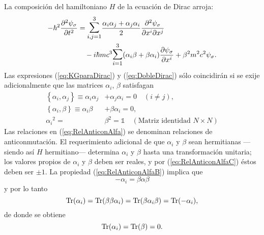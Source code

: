 La composición del hamiltoniano $H$ de la ecuación de Dirac arroja:
\begin{equation}\label{eq:DobleDirac}
\begin{aligned}
 -\hbar^2 \frac{\partial^2 \psi_\sigma}{\partial t^2} &= \mathlarger{\mathlarger{\sum}}_{i,j=1}^3\frac{\alpha_i \alpha_j+\alpha_j \alpha_i}{2}\frac{\partial^2 \psi_\sigma}{\partial x^i \partial x^j} \\
   & \quad -i\hbar mc^3 \mathlarger{\mathlarger{\sum}}_{i=1}^3 (\alpha_i \beta+\beta \alpha_i)\frac{\partial \psi_\sigma}{\partial x^i}+\beta^2 m^2 c^2\psi_\sigma.
\end{aligned}
\end{equation}
Las expresiones (\ref{eq:KGparaDirac}) y (\ref{eq:DobleDirac}) sólo coincidirán si se exije adicionalmente que las matrices $\alpha_i$, $\beta$ satisfagan
\begin{subequations}\label{eq:RelAnticonAlfa}
\begin{align}
 \left\{ \alpha_i,\alpha_j \right\} \equiv \alpha_i\alpha_j &+\alpha_j\alpha_i =0\quad (i\neq j),\label{eq:RelAnticonAlfaA}\\[8pt] 
 \left\{ \alpha_i,\beta \right\} \equiv \alpha_i\beta &+\beta\alpha_i =0, 
 \label{eq:RelAnticonAlfaB}\\[8pt]
 {\alpha_i}^2=& \beta^2=\mathbb{1} \quad (\text{Matriz identidad } N\times N)\label{eq:RelAnticonAlfaC}
\end{align}
\end{subequations}
Las relaciones en (\ref{eq:RelAnticonAlfa}) se denominan relaciones de anticonmutación. El requerimiento adicional de que $\alpha_i$ y $\beta$ sean hermitianas ---siendo así $H$ hermitiano--- determina $\alpha_i$ y $\beta$ hasta una transformación unitaria; los valores propios de $\alpha_i$ y $\beta$ deben ser reales, y por (\ref{eq:RelAnticonAlfaC}) éstos deben ser $\pm1$. La propiedad (\ref{eq:RelAnticonAlfaB}) implica que 
\begin{equation*}
     -\alpha_i=\beta \alpha \beta
\end{equation*}
y por lo tanto
\begin{equation}\label{eq:TrazaAlfaBeta}
 \operatorname{Tr}(\alpha_i)=\operatorname{Tr}(\beta\beta \alpha_i)=\operatorname{Tr}(\beta \alpha_i \beta)=\operatorname{Tr}(-\alpha_i),
\end{equation}
de donde se obtiene
\begin{equation}\label{eq:TrazaCero}
     \operatorname{Tr}(\alpha_i)=\operatorname{Tr}(\beta)=0.
\end{equation}

